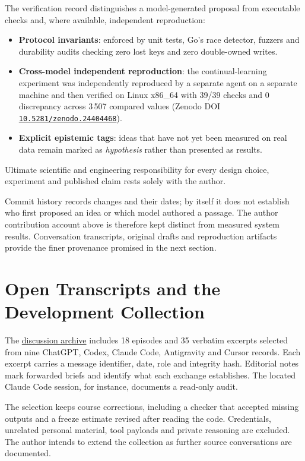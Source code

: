 \documentclass[11pt]{article}
\begin{document}
The verification record distinguishes a model-generated proposal from executable checks and, where available, independent reproduction:
\begin{itemize}[leftmargin=1.5em,itemsep=1pt]
  \item \textbf{Protocol invariants}: enforced by unit tests, Go's race detector, fuzzers and durability audits checking zero lost keys and zero double-owned writes.
  \item \textbf{Cross-model independent reproduction}: the continual-learning experiment was independently reproduced by a separate agent on a separate machine and then verified on Linux x86\_64 with 39/39 checks and 0 discrepancy across 3\,507 compared values (Zenodo DOI \href{https://doi.org/10.5281/zenodo.24404468}{\nolinkurl{10.5281/zenodo.24404468}}).
  \item \textbf{Explicit epistemic tags}: ideas that have not yet been measured on real data remain marked as \emph{hypothesis} rather than presented as results.
\end{itemize}
Ultimate scientific and engineering responsibility for every design choice, experiment and published claim rests solely with the author.

Commit history records changes and their dates; by itself it does not establish who first proposed an idea or which model authored a passage. The author contribution account above is therefore kept distinct from measured system results. Conversation transcripts, original drafts and reproduction artifacts provide the finer provenance promised in the next section.

\section{Open Transcripts and the Development Collection}\hypertarget{ix:transcripts}{}
The \href{https://github.com/indexus/papers/tree/main/ai-transparency}{discussion archive} includes 18 episodes and 35 verbatim excerpts selected from nine ChatGPT, Codex, Claude Code, Antigravity and Cursor records. Each excerpt carries a message identifier, date, role and integrity hash. Editorial notes mark forwarded briefs and identify what each exchange establishes. The located Claude Code session, for instance, documents a read-only audit.

The selection keeps course corrections, including a checker that accepted missing outputs and a freeze estimate revised after reading the code. Credentials, unrelated personal material, tool payloads and private reasoning are excluded. The author intends to extend the collection as further source conversations are documented.
\end{document}
